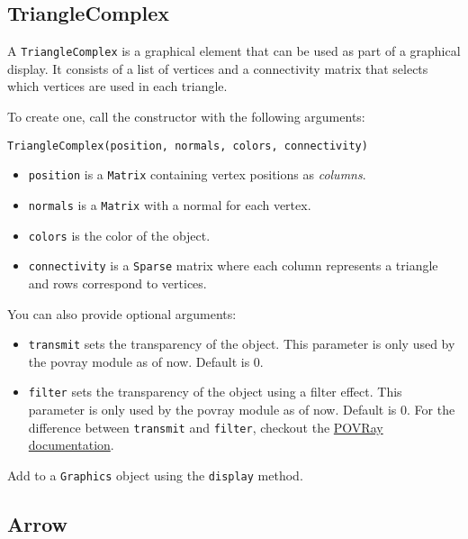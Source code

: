 \hypertarget{trianglecomplex}{%
\subsection{TriangleComplex}\label{trianglecomplex}}

A \texttt{TriangleComplex} is a graphical element that can be used as
part of a graphical display. It consists of a list of vertices and a
connectivity matrix that selects which vertices are used in each
triangle.

To create one, call the constructor with the following arguments:

\begin{lstlisting}
TriangleComplex(position, normals, colors, connectivity)
\end{lstlisting}

\begin{itemize}

\item
  \texttt{position} is a \texttt{Matrix} containing vertex positions as
  \emph{columns}.
\item
  \texttt{normals} is a \texttt{Matrix} with a normal for each vertex.
\item
  \texttt{colors} is the color of the object.
\item
  \texttt{connectivity} is a \texttt{Sparse} matrix where each column
  represents a triangle and rows correspond to vertices.
\end{itemize}

You can also provide optional arguments:

\begin{itemize}

\item
  \texttt{transmit} sets the transparency of the object. This parameter
  is only used by the povray module as of now. Default is 0.
\item
  \texttt{filter} sets the transparency of the object using a filter
  effect. This parameter is only used by the povray module as of now.
  Default is 0. For the difference between \texttt{transmit} and
  \texttt{filter}, checkout the
  \href{http://xahlee.info/3d/povray-glassy.html}{POVRay documentation}.
\end{itemize}

Add to a \texttt{Graphics} object using the \texttt{display} method.

\hypertarget{arrow}{%
\subsection{Arrow}\label{arrow}}

